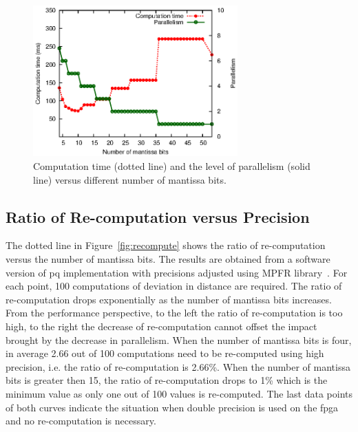 \begin{figure}[ht]
\begin{center}
\includegraphics[width=0.7\textwidth]{3_precision/figures/fig_exectime}
\end{center}
\caption[Computation time and the level of parallelism versus different number of mantissa bits.]{Computation time (dotted line) and the level of parallelism (solid line) versus different number of mantissa bits.}
\label{fig:exectime}
\end{figure}

\subsection{Ratio of Re-computation versus Precision}
\label{sec:precision_recompute}
The dotted line in Figure~\ref{fig:recompute} shows the ratio of re-computation versus the number of mantissa bits.
The results are obtained from a software version of \gls{pq} implementation with precisions adjusted using MPFR library~\cite{fousse07}.
For each point, 100 computations of deviation in distance are required.
The ratio of re-computation drops exponentially as the number of mantissa bits increases.
From the performance perspective, to the left the ratio of re-computation is too high, to the right the decrease of re-computation cannot offset the impact brought by the decrease in parallelism.
When the number of mantissa bits is four, in average 2.66 out of 100 computations need to be re-computed using high precision, i.e. the ratio of re-computation is 2.66\%.
When the number of mantissa bits is greater then 15, the ratio of re-computation drops to 1\% which is the minimum value as only one out of 100 values is re-computed.
The last data points of both curves indicate the situation when double precision is used on the \gls{fpga} and no re-computation is necessary.

